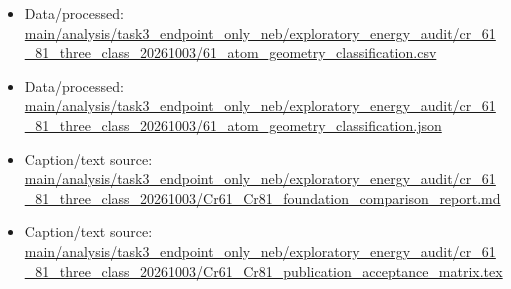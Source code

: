 \begin{itemize}[leftmargin=1.4em,noitemsep]
\item Data/processed: \begingroup\scriptsize\url{main/analysis/task3_endpoint_only_neb/exploratory_energy_audit/cr_61_81_three_class_20261003/61_atom_geometry_classification.csv}\endgroup
\item Data/processed: \begingroup\scriptsize\url{main/analysis/task3_endpoint_only_neb/exploratory_energy_audit/cr_61_81_three_class_20261003/61_atom_geometry_classification.json}\endgroup
\item Caption/text source: \begingroup\scriptsize\url{main/analysis/task3_endpoint_only_neb/exploratory_energy_audit/cr_61_81_three_class_20261003/Cr61_Cr81_foundation_comparison_report.md}\endgroup
\item Caption/text source: \begingroup\scriptsize\url{main/analysis/task3_endpoint_only_neb/exploratory_energy_audit/cr_61_81_three_class_20261003/Cr61_Cr81_publication_acceptance_matrix.tex}\endgroup
\end{itemize}
